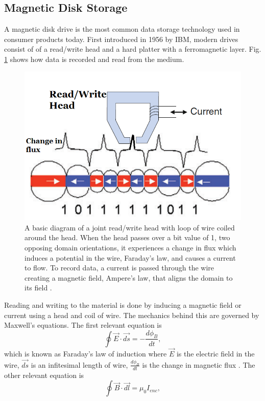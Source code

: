 \documentclass[ notitlepage, numerical, 11pt]{revtex4-1} %
\begin{document}
\subsection{Magnetic Disk Storage}
A magnetic disk drive is the most common data storage technology used in consumer products today. First introduced in 1956 by IBM, modern drives consist of of a read/write head and a hard platter with a ferromagnetic layer. Fig. \ref{basic} shows how data is recorded and read from the medium.
\begin{figure}[H]
\centerline{\includegraphics[scale=.55]{basic.png}}
\caption{A basic diagram of a joint read/write head with  loop of wire coiled around the head. When the head passes over a bit value of 1, two opposing domain orientations, it experiences a change in flux which induces a potential in the wire, Faraday's law, and causes a current to flow. To record data, a current is passed through the wire creating a magnetic field, Ampere's law, that aligns the domain to its field \cite{perpendicular}.}
\label{basic}
\end{figure}
Reading and writing to the material is done by inducing a magnetic field or current using a head and coil of wire. The mechanics behind this are governed by Maxwell's equations. The first relevant equation is
\begin{equation}
\oint \vec{E}\cdot \vec{ds} = -\frac{d\phi_B}{dt},
\label{faraday}
\end{equation}
which is known as Faraday's law of induction where $ \vec{E}$ is the electric field in the wire, $\vec{ds}$ is an infitesimal length of wire, $\frac{d\phi_B}{dt}$ is the change in magnetic flux \cite{purcell}. The other relevant equation is
\begin{equation}
\oint \vec{B}\cdot \vec{dl} = \mu_0 I_{enc},
\label{ampere}
\end{equation}
\end{document}
